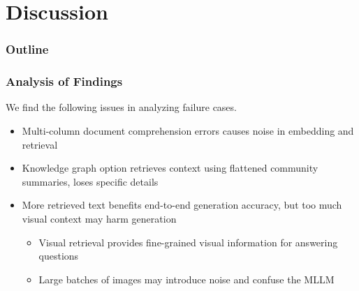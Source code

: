 \documentclass[aspectratio=1610]{beamer}
\begin{document}
    \section{Discussion}
    \begin{frame}
        \frametitle{Outline}
        \tableofcontents[currentsection, subsectionstyle=show/shaded] 
    \end{frame}

    \begin{frame}
        \frametitle{Analysis of Findings}
        We find the following issues in analyzing failure cases.
        \begin{itemize}
            \item Multi-column document comprehension errors causes noise in embedding and retrieval
            \item Knowledge graph option retrieves context using flattened community summaries, loses specific details
            \item More retrieved text benefits end-to-end generation accuracy, but too much visual context may harm generation
                \begin{itemize}
                    \item Visual retrieval provides fine-grained visual information for answering questions
                    \item Large batches of images may introduce noise and confuse the MLLM
                \end{itemize}
        \end{itemize}
    \end{frame}
\end{document}
